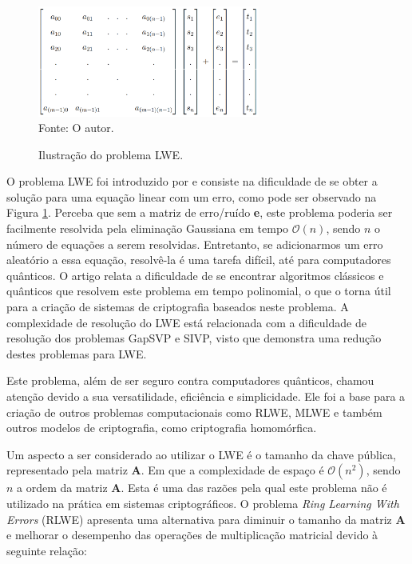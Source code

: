     \begin{figure}[htb!]
        \centering
        \caption{Ilustração do problema \ac{LWE}.}
        \includegraphics[width=0.65\textwidth]{Figuras/lwe.png}\\
        \footnotesize{Fonte: O autor.}
        \label{fig:lwe}
    \end{figure}

    O problema \ac{LWE} foi introduzido por \cite{regev} e consiste na dificuldade de se obter a solução para uma equação linear com um erro, como pode ser observado na Figura \ref{fig:lwe}. Perceba que sem a matriz de erro/ruído \textbf{e}, este problema poderia ser facilmente resolvida pela eliminação Gaussiana em tempo $\mathcal{O}(n)$, sendo $n$ o número de equações a serem resolvidas. Entretanto, se adicionarmos um erro aleatório a essa equação, resolvê-la é uma tarefa difícil, até para computadores quânticos. O artigo \cite{regev} relata a dificuldade de se encontrar algoritmos clássicos e quânticos que resolvem este problema em tempo polinomial, o que o torna útil para a criação de sistemas de criptografia baseados neste problema. A complexidade de resolução do \ac{LWE} está relacionada com a dificuldade de resolução dos problemas \ac{GapSVP} e \ac{SIVP}, visto que \cite{regev} demonstra uma redução destes problemas para \ac{LWE}.

    Este problema, além de ser seguro contra computadores quânticos, chamou atenção devido a sua versatilidade, eficiência e simplicidade. Ele foi a base para a criação de outros problemas computacionais como \ac{RLWE}, \ac{MLWE} e também outros modelos de criptografia, como criptografia homomórfica.

    Um aspecto a ser considerado ao utilizar o \ac{LWE} é o tamanho da chave pública, representado pela matriz \textbf{A}. Em que a complexidade de espaço é $\mathcal{O}(n^2)$, sendo $n$ a ordem da matriz \textbf{A}. Esta é uma das razões pela qual este problema não é utilizado na prática em sistemas criptográficos. O problema \textit{Ring Learning With Errors} (RLWE) apresenta uma alternativa para diminuir o tamanho da matriz \textbf{A} e melhorar o desempenho das operações de multiplicação matricial devido à seguinte relação:

